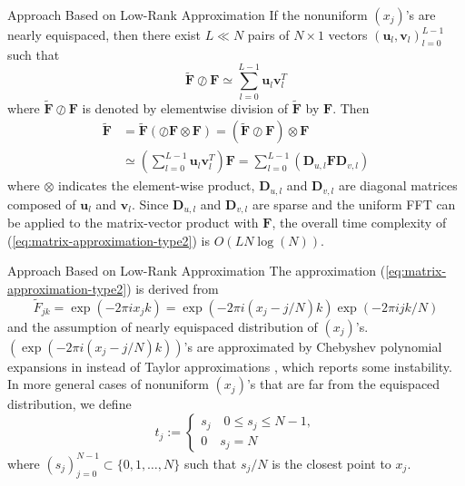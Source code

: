 \documentclass{beamer}
\begin{document}
\begin{frame}{Approach Based on Low-Rank Approximation}
  If the nonuniform $(x_j)$'s are nearly equispaced, then there exist $L \ll N$ pairs of $N \times 1$
  vectors $(\bm{u}_l, \bm{v}_l)_{l=0}^{L-1}$ such that
  \begin{equation}
    \bm{\tilde{F}}\oslash\bm{F} \simeq
    \sum_{l=0}^{L-1}\bm{u}_{l}\bm{v}_{l}^{T}
  \end{equation}
  where $\tilde{\bm{F}}\oslash\bm{F}$ is denoted by elementwise division of $\tilde{\bm{F}}$ by $\bm{F}$. Then
  \begin{align}
       \tilde{\bm{F}}
    &= \tilde{\bm{F}}\left(\oslash\bm{F}\otimes\bm{F}\right)
     = \left(\tilde{\bm{F}}\oslash\bm{F}\right)\otimes\bm{F} \\
    &\simeq \left(\sum_{l=0}^{L-1}\bm{u}_{l}\bm{v}_{l}^{T}\right)\bm{F} 
     = \sum_{l=0}^{L-1}\left(\bm{D}_{u,l}\bm{F}\bm{D}_{v,l}\right)
    \label{eq:matrix-approximation-type2}
  \end{align}
  where $\otimes$ indicates the element-wise product,
  $\bm{D}_{u,l}$ and $\bm{D}_{v,l}$ are diagonal matrices composed of $\bm{u}_{l}$ and $\bm{v}_{l}$.
  Since $\bm{D}_{u,l}$ and $\bm{D}_{v,l}$ are sparse and the uniform FFT can be applied to the matrix-vector product with $\bm{F}$, the overall time complexity of (\ref{eq:matrix-approximation-type2})
  is $O(L N \log(N))$.
\end{frame}

\begin{frame}{Approach Based on Low-Rank Approximation}
  The approximation (\ref{eq:matrix-approximation-type2}) is derived from 
  \begin{equation}
      \tilde{F}_{jk} = \exp(-2\pi i x_j k)
    = \exp(-2\pi i (x_j - j/N)k)\exp(-2\pi i jk/N)
  \end{equation}
  and the assumption of nearly equispaced distribution of $(x_j)$'s.
  $(\exp(-2\pi i (x_j - j/N)k))$'s are approximated by Chebyshev polynomial expansions 
  in \cite{SISC-2018-Townsend} instead of Taylor approximations \cite{SISC-1996-Anderson}, 
  which reports some instability.
  In more general cases of nonuniform $(x_j)$'s that are far from the equispaced distribution,
  we define 
  \begin{equation}
    t_{j} :=
    \begin{cases}
      s_{j} \quad 0 \le s_{j} \le N-1, \\
      0     \quad s_{j} = N
    \end{cases}
  \end{equation}
  where $(s_{j})_{j=0}^{N-1} \subset \{0, 1, \dots, N\}$ such that
  $s_{j}/N$ is the closest point to $x_{j}$.
\end{frame}
\end{document}
